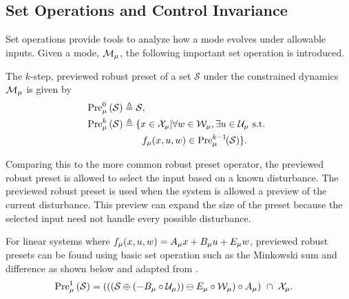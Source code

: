 \subsection{Set Operations and Control Invariance}
Set operations provide tools to analyze how a mode evolves under allowable inputs. Given a mode, $\mode{\modeidx}$, the following important set operation is introduced. 
\begin{definition}\label{def:prev_robust_preset}
The $k$-step, previewed robust preset of a set $\mathcal{S}$ under the constrained dynamics $\mode{\modeidx}$ is given by
\begin{align}
\PreviewedPre[\modeidx][0]{\mathcal{S}}&\triangleq\mathcal{S},\\
\PreviewedPre[\modeidx][k]{\mathcal{S}}&\triangleq\{x\in\xcon[\modeidx]|\forall w\in\wcon[\modeidx],\exists u\in\ucon[\modeidx]\text{ s.t. }\nonumber\\
&\qquad f_\modeidx(x,u,w)\in\PreviewedPre[\modeidx][k-1]{\mathcal{S}}\}.
\end{align}
\end{definition}
Comparing this to the more common robust preset operator, the previewed robust preset is allowed to select the input based on a known disturbance. The previewed robust preset is used when the system is allowed a preview of the current disturbance. This preview can expand the size of the preset because the selected input need not handle every possible disturbance. 

For linear systems where $f_{\mu}(x,u,w) = A_{\mu} x + B_{\mu} u + E_{\mu} w$, previewed robust presets can be found using basic set operation such as the Minkowski sum and difference as shown below and adapted from \cite{Borrelli2017}.
\begin{align*}
\PreviewedPre[\modeidx][1]{\mathcal{S}} &= \left(\left(\left(\mathcal{S}\oplus\left(-B_\modeidx\circ\ucon[\modeidx]\right)\right)\ominus E_\modeidx\circ\wcon[\modeidx]\right)\circ A_\modeidx\right)\ \cap\ \xcon[\modeidx].
\end{align*}

